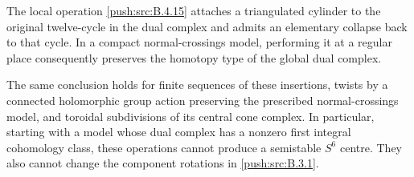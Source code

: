 \begin{proposition}\hypertarget{tag-030K}{}\label{push:src:B.4.16}
\label{push:B416}

The local operation \ref{push:src:B.4.15} attaches a triangulated
cylinder to the original twelve-cycle in the dual
complex and admits an elementary collapse back to that
cycle. In a compact normal-crossings model, performing
it at a regular place consequently preserves the
homotopy type of the global dual complex.

The same conclusion holds for finite sequences of these
insertions, twists by a connected holomorphic group
action preserving the prescribed normal-crossings
model, and toroidal subdivisions of its central cone
complex. In particular, starting with a model whose
dual complex has a nonzero first integral cohomology
class, these operations cannot produce a semistable
$S^6$ centre. They also cannot change the component
rotations in \ref{push:src:B.3.1}.

\end{proposition}



